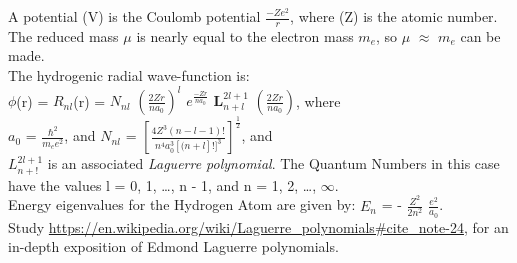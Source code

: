 \documentclass[a4paper, 10pt, onepage]{elegantbook}
\begin{document}
 A potential (V) is the Coulomb potential $\frac{-Ze^2}{r}$, where (Z) is the atomic number. The reduced mass $\mu$ is nearly equal to the electron mass $m_e$, so $\mu$ $\approx$ $m_e$ can be made.  \\

The hydrogenic radial wave-function is:  \\

$\phi$(r) = $R_{nl}$(r) = $N_{nl}$ $(\frac{2Zr}{na_0})^l$ $e^{\frac{-Zr}{na_0}}$ $\mathbf{\textbf{L}}^{2l + 1}_{n + l}$ $(\frac{2Zr}{na_0})$, where   \\

$a_0$ = $\frac{\hbar^2}{m_e e^2}$, and $N_{nl}$ = $\left[\frac{4Z^3(n - l - 1)!}{n^4a^3_0[(n + l]!]^3} \right]^\frac{1}{2}$, and \\

$L^{2l + 1}_{n + !}$ is an associated \emph{Laguerre polynomial}. The Quantum Numbers in this case have the values l = 0, 1, \ldots, n - 1, and n = 1, 2, \ldots, $\infty$.  \\

Energy eigenvalues for the Hydrogen Atom are given by: $E_n$ = - $\frac{Z^2}{2n^2}$ $\frac{e^2}{a_0}$.  \\

Study \url{https://en.wikipedia.org/wiki/Laguerre_polynomials#cite_note-24}, for an in-depth exposition of Edmond Laguerre polynomials.

\end{document}
